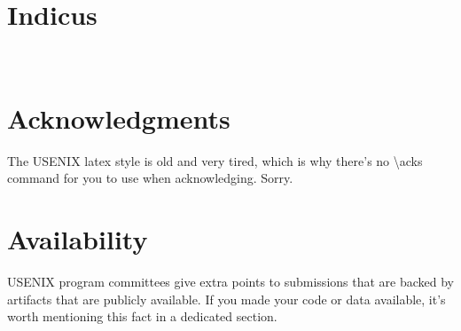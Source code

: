 \documentclass[letterpaper,twocolumn,10pt]{article}
\begin{document}
\section{Indicus}
\\


%



















\section*{Acknowledgments}

The USENIX latex style is old and very tired, which is why
there's no \textbackslash{}acks command for you to use when
acknowledging. Sorry.

\section*{Availability}

USENIX program committees give extra points to submissions that are
backed by artifacts that are publicly available. If you made your code
or data available, it's worth mentioning this fact in a dedicated
section.


%


\end{document}
